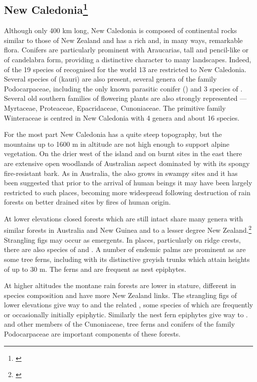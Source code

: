 \subsection[New Caledonia]{New Caledonia\footnote{\cite{schmid1981fleurs}}}

Although only 400 km long, New Caledonia is composed of continental rocks similar to those of New Zealand and has a rich and, in many ways, remarkable flora.
Conifers are particularly prominent with Araucarias, tall and pencil-like or of candelabra form, providing a distinctive character to many landscapes.
Indeed, of the 19 species of  recognised for the world 13 are restricted to New Caledonia.
Several species of  (kauri) are also present, several genera of the family Podocarpaceae, including the only known parasitic conifer () and 3 species of .
Several old southern families of flowering plants are also strongly represented — Myrtaceae, Proteaceae, Epacridaceae, Cunoniaceae.
The primitive family Winteraceae is centred in New Caledonia with 4 genera and about 16 species.

For the most part New Caledonia has a quite steep topography, but the mountains up to 1600 m in altitude are not high enough to support alpine vegetation.
On the drier west of the island and on burnt sites in the east there are extensive open woodlands of Australian aspect dominated by  with its spongy fire-resistant bark.
As in Australia, the  also grows in swampy sites and it has been suggested that prior to the arrival of human beings it may have been largely restricted to such places, becoming more widespread following destruction of rain forests on better drained sites by fires of human origin.

At lower elevations closed forests which are still intact share many genera with similar forests in Australia and New Guinea and to a lesser degree New Zealand.\footnote{\cite{morat1986floristic}}
Strangling figs may occur as emergents.
In places, particularly on ridge crests, there are also species of  and .
A number of endemic palms are prominent as are some tree ferns, including  with its distinctive greyish trunks which attain heights of up to 30 m.
The ferns  and  are frequent as nest epiphytes.

At higher altitudes the montane rain forests are lower in stature, different in species composition and have more New Zealand links.
The strangling figs of lower elevations give way to  and the related , some species of which are frequently or occasionally initially epiphytic.
Similarly the nest fern epiphytes give way to .  and other members of the Cunoniaceae, tree ferns and conifers of the family Podocarpaceae are important components of these forests.

